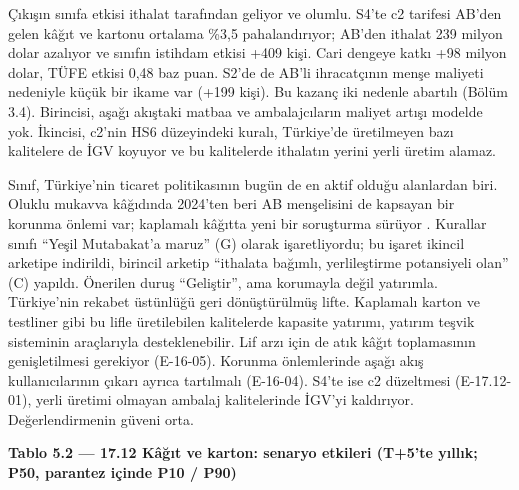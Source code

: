 Çıkışın sınıfa etkisi ithalat tarafından geliyor ve olumlu. S4'te c2 tarifesi AB'den gelen kâğıt ve kartonu ortalama \%3,5 pahalandırıyor; AB'den ithalat 239 milyon dolar azalıyor ve sınıfın istihdam etkisi +409 kişi. Cari dengeye katkı +98 milyon dolar, TÜFE etkisi 0,48 baz puan. S2'de de AB'li ihracatçının menşe maliyeti nedeniyle küçük bir ikame var (+199 kişi). Bu kazanç iki nedenle abartılı (Bölüm 3.4). Birincisi, aşağı akıştaki matbaa ve ambalajcıların maliyet artışı modelde yok. İkincisi, c2'nin HS6 düzeyindeki kuralı, Türkiye'de üretilmeyen bazı kalitelere de İGV koyuyor ve bu kalitelerde ithalatın yerini yerli üretim alamaz.

Sınıf, Türkiye'nin ticaret politikasının bugün de en aktif olduğu alanlardan biri. Oluklu mukavva kâğıdında 2024'ten beri AB menşelisini de kapsayan bir korunma önlemi var; kaplamalı kâğıtta yeni bir soruşturma sürüyor \etiketV{}. Kurallar sınıfı ``Yeşil Mutabakat'a maruz'' (G) olarak işaretliyordu; bu işaret ikincil arketipe indirildi, birincil arketip ``ithalata bağımlı, yerlileştirme potansiyeli olan'' (C) yapıldı. Önerilen duruş ``Geliştir'', ama korumayla değil yatırımla. Türkiye'nin rekabet üstünlüğü geri dönüştürülmüş lifte. Kaplamalı karton ve testliner gibi bu lifle üretilebilen kalitelerde kapasite yatırımı, yatırım teşvik sisteminin araçlarıyla desteklenebilir. Lif arzı için de atık kâğıt toplamasının genişletilmesi gerekiyor (E-16-05). Korunma önlemlerinde aşağı akış kullanıcılarının çıkarı ayrıca tartılmalı (E-16-04). S4'te ise c2 düzeltmesi (E-17.12-01), yerli üretimi olmayan ambalaj kalitelerinde İGV'yi kaldırıyor. Değerlendirmenin güveni orta.


\textbf{Tablo 5.2 --- 17.12 Kâğıt ve karton: senaryo etkileri (T+5'te yıllık; P50, parantez içinde P10 / P90)}

\nopagebreak[4]

\begingroup\gbtablo\small

